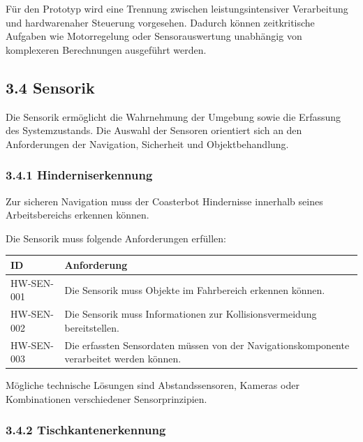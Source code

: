\documentclass[
]{article}
\begin{document}
Für den Prototyp wird eine Trennung zwischen leistungsintensiver
Verarbeitung und hardwarenaher Steuerung vorgesehen. Dadurch können
zeitkritische Aufgaben wie Motorregelung oder Sensorauswertung
unabhängig von komplexeren Berechnungen ausgeführt werden.

\subsection{3.4 Sensorik}\label{sensorik}

Die Sensorik ermöglicht die Wahrnehmung der Umgebung sowie die Erfassung
des Systemzustands. Die Auswahl der Sensoren orientiert sich an den
Anforderungen der Navigation, Sicherheit und Objektbehandlung.

\subsubsection{3.4.1 Hinderniserkennung}\label{hinderniserkennung}

Zur sicheren Navigation muss der Coasterbot Hindernisse innerhalb seines
Arbeitsbereichs erkennen können.

Die Sensorik muss folgende Anforderungen erfüllen:

\begin{longtable}[]{@{}
  >{\raggedright\arraybackslash}p{}
  >{\raggedright\arraybackslash}p{}@{}}
\toprule\noalign{}
\begin{minipage}[b]{\linewidth}\raggedright
ID
\end{minipage} & \begin{minipage}[b]{\linewidth}\raggedright
Anforderung
\end{minipage} \\
\midrule\noalign{}
\endhead
\bottomrule\noalign{}
\endlastfoot
HW-SEN-001 & Die Sensorik muss Objekte im Fahrbereich erkennen
können. \\
HW-SEN-002 & Die Sensorik muss Informationen zur Kollisionsvermeidung
bereitstellen. \\
HW-SEN-003 & Die erfassten Sensordaten müssen von der
Navigationskomponente verarbeitet werden können. \\
\end{longtable}

Mögliche technische Lösungen sind Abstandssensoren, Kameras oder
Kombinationen verschiedener Sensorprinzipien.

\subsubsection{3.4.2 Tischkantenerkennung}\label{tischkantenerkennung}
\end{document}
